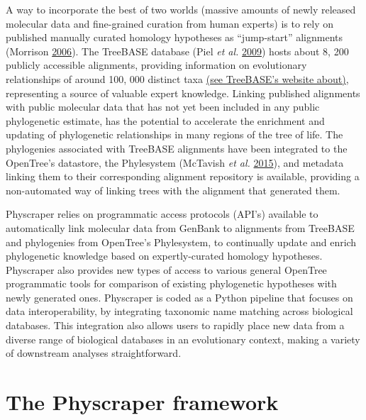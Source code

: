 \documentclass[]{article}
\begin{document}
A way to incorporate the best of two worlds (massive amounts of newly released molecular data and fine-grained curation from human experts) is to rely on published manually curated homology hypotheses as ``jump-start'' alignments (Morrison \protect\hyperlink{ref-morrison2006multiple}{2006}). The TreeBASE database (Piel \emph{et al.} \protect\hyperlink{ref-piel2009treebase}{2009}) hosts about 8, 200 publicly accessible alignments, providing information on evolutionary relationships of around 100, 000 distinct taxa \href{https://www.treebase.org/treebase-web/home.html\#:~:text=TreeBASE\%20is\%20produced\%20and\%20governed,mapped\%20to\%20104\%2C593\%20distinct\%20taxa.}{(see TreeBASE's website about)}, representing a source of valuable expert knowledge. Linking published alignments with public molecular data that has not yet been included in any public phylogenetic estimate, has the potential to accelerate the enrichment and updating of phylogenetic relationships in many regions of the tree of life. The phylogenies associated with TreeBASE alignments have been integrated to the OpenTree's datastore, the Phylesystem (McTavish \emph{et al.} \protect\hyperlink{ref-mctavish2015phylesystem}{2015}), and metadata linking them to their corresponding alignment repository is available, providing a non-automated way of linking trees with the alignment that generated them.

Physcraper relies on programmatic access protocols (API's) available to automatically link molecular data from GenBank to alignments from TreeBASE and phylogenies from OpenTree's Phylesystem, to continually update and enrich phylogenetic knowledge based on expertly-curated homology hypotheses. Physcraper also provides new types of access to various general OpenTree programmatic tools for comparison of existing phylogenetic hypotheses with newly generated ones.
Physcraper is coded as a Python pipeline that focuses on data interoperability, by integrating taxonomic name matching across biological databases. This integration also allows users to rapidly place new data from a diverse range of biological databases in an evolutionary context, making a variety of downstream analyses straightforward.

\hypertarget{the-physcraper-framework}{%
\section{The Physcraper framework}\label{the-physcraper-framework}}
\end{document}
